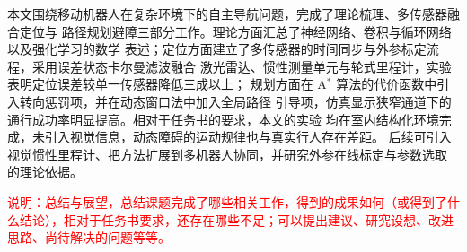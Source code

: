 \begin{conclusion}

本文围绕移动机器人在复杂环境下的自主导航问题，完成了理论梳理、多传感器融合定位与
路径规划避障三部分工作。理论方面汇总了神经网络、卷积与循环网络以及强化学习的数学
表述；定位方面建立了多传感器的时间同步与外参标定流程，采用误差状态卡尔曼滤波融合
激光雷达、惯性测量单元与轮式里程计，实验表明定位误差较单一传感器降低三成以上；
规划方面在 A$^{*}$ 算法的代价函数中引入转向惩罚项，并在动态窗口法中加入全局路径
引导项，仿真显示狭窄通道下的通行成功率明显提高。相对于任务书的要求，本文的实验
均在室内结构化环境完成，未引入视觉信息，动态障碍的运动规律也与真实行人存在差距。
后续可引入视觉惯性里程计、把方法扩展到多机器人协同，并研究外参在线标定与参数选取
的理论依据。

\textcolor{red}{说明：总结与展望，总结课题完成了哪些相关工作，得到的成果如何（或得到了什么结论），相对于任务书要求，还存在哪些不足；可以提出建议、研究设想、改进思路、尚待解决的问题等等。}

\end{conclusion}
